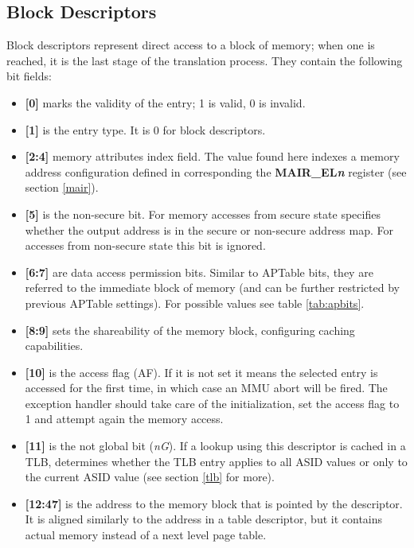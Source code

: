 \documentclass[12pt,a4paper,openright,twoside]{report}
\begin{document}
\subsection{Block Descriptors}
\label{mmublock}
Block descriptors represent direct access to a block of memory; when one is reached,
it is the last stage of the translation process. They contain the following bit
fields:
\begin{itemize}
    \item \textbf{[0]} marks the validity of the entry; 1 is valid, 0 is invalid.
    \item \textbf{[1]} is the entry type. It is 0 for block descriptors.
    \item \textbf{[2:4]} memory attributes index field. The value found here
        indexes a memory address configuration defined in corresponding 
        the \textbf{MAIR\_EL\textit{n}} register (see section \ref{mair}).
    \item \textbf{[5]} is the non-secure bit. For memory accesses from 
        secure state specifies whether the output address is in
        the secure or non-secure address map. For accesses from non-secure state
        this bit is ignored.
    \item \textbf{[6:7]} are data access permission bits. Similar to APTable bits,
        they are referred to the immediate block of memory (and can be further
        restricted by previous APTable settings). For possible values see table
        \ref{tab:apbits}.
    \item \textbf{[8:9]} sets the shareability of the memory block, configuring
        caching capabilities.
    \item \textbf{[10]} is the access flag (AF). If it is not set it means the 
        selected entry is accessed for the first time, in which case an MMU abort
        will be fired. The exception handler should take care of the initialization,
        set the access flag to 1 and attempt again the memory access.
    \item \textbf{[11]} is the not global bit (\textit{nG}). If a lookup using this 
        descriptor is cached in a TLB, determines whether the TLB
        entry applies to all ASID values or only to the current ASID value
        (see section \ref{tlb} for more).
    \item \textbf{[12:47]} is the address to the memory block that is pointed by
        the descriptor. It is aligned similarly to the address in a table descriptor,
        but it contains actual memory instead of a next level page table.

\end{itemize}
\end{document}
